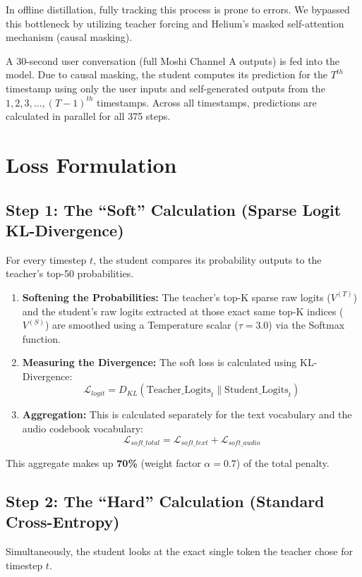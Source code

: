 \documentclass[12pt]{article}
\begin{document}
In offline distillation, fully tracking this process is prone to errors. We bypassed this bottleneck by utilizing teacher forcing and Helium's masked self-attention mechanism (causal masking).

A 30-second user conversation (full Moshi Channel A outputs) is fed into the model. Due to causal masking, the student computes its prediction for the $T^{th}$ timestamp using only the user inputs and self-generated outputs from the $1, 2, 3, \dots, (T - 1)^{th}$ timestamps. Across all timestamps, predictions are calculated in parallel for all 375 steps.

\section{Loss Formulation}

\subsection{Step 1: The ``Soft'' Calculation (Sparse Logit KL-Divergence)}
For every timestep $t$, the student compares its probability outputs to the teacher's top-50 probabilities.

\begin{enumerate}
    \item \textbf{Softening the Probabilities:} The teacher's top-K sparse raw logits ($V^{(T)}$) and the student's raw logits extracted at those exact same top-K indices ($V^{(S)}$) are smoothed using a Temperature scalar ($\tau = 3.0$) via the Softmax function.
    \item \textbf{Measuring the Divergence:} The soft loss is calculated using KL-Divergence:
    \[
    \mathcal{L}_{logit} = D_{KL}({\mathrm{Teacher\_Logits}}_{t} \parallel {\mathrm{Student\_Logits}}_{t})
    \]
    \item \textbf{Aggregation:} This is calculated separately for the text vocabulary and the audio codebook vocabulary:
    \[
    \mathcal{L}_{soft\_total} = \mathcal{L}_{soft\_text} + \mathcal{L}_{soft\_audio}
    \]
\end{enumerate}

This aggregate makes up \textbf{70\%} (weight factor $\alpha = 0.7$) of the total penalty.

\subsection{Step 2: The ``Hard'' Calculation (Standard Cross-Entropy)}
Simultaneously, the student looks at the exact single token the teacher chose for timestep $t$.
\end{document}
